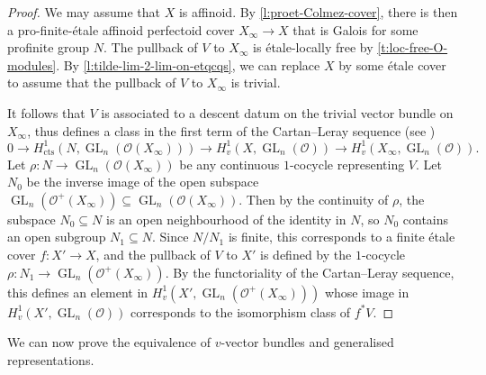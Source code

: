 \documentclass[10pt,a4paper]{article}
\theoremstyle{definition}
\theoremstyle{remark}
\newcommand{\lra}{\longrightarrow}
\renewcommand{\O}{\mathcal{O}}
\newcommand{\GL}{\operatorname{GL}}
\newcommand{\cts}{{\operatorname{cts}}}
\numberwithin{equation}{section}
\begin{document}
\begin{proof}
	We may assume that $X$ is affinoid.
	By \cref{l:proet-Colmez-cover}, there is then a pro-finite-\'etale affinoid perfectoid cover $X_\infty\to X$ that is Galois for some profinite group $N$. The pullback of $V$ to $X_\infty$ is \'etale-locally free by \cref{t:loc-free-O-modules}. By \cref{l:tilde-lim-2-lim-on-etqcqs}, we can replace $X$ by some \'etale cover to assume that the pullback of $V$ to $X_\infty$ is trivial.
	
	It follows that $V$ is associated to a descent datum on the trivial vector bundle on $X_\infty$, thus defines a class in the first term of the Cartan--Leray sequence (see \cite[Proposition~2.8]{heuer-v_lb_rigid})
	\[ 0\lra H^1_{\cts}(N,\GL_n(\O(X_\infty)))\lra H^1_v(X,\GL_n(\O))\lra  H^1_v(X_\infty,\GL_n(\O)).\]
	Let $\rho\colon N\to \GL_n(\O(X_\infty))$ be any continuous $1$-cocycle representing $V$. Let $N_0$ be the inverse image of the open subspace $\GL_n(\O^+(X_\infty))\subseteq \GL_n(\O(X_\infty))$. Then by the continuity of $\rho$, the subspace $N_0\subseteq N$ is an open neighbourhood of the identity in $N$, so $N_0$ contains  an open subgroup $N_1\subseteq N$. Since $N/N_1$ is finite, this corresponds to a finite \'etale cover $f\colon X'\to X$, and the pullback of $V$ to $X'$ is defined by the $1$-cocycle $\rho\colon N_1\to \GL_n(\O^+(X_\infty))$. By the functoriality of the Cartan--Leray sequence, this defines an element in $H^1_v(X',\GL_n(\O^+(X_\infty)))$ whose image in $H^1_v(X',\GL_n(\O))$ corresponds to the isomorphism class of $f^{\ast}V$.
\end{proof}

We can now prove the equivalence of $v$-vector bundles and generalised representations. 
\end{document}
